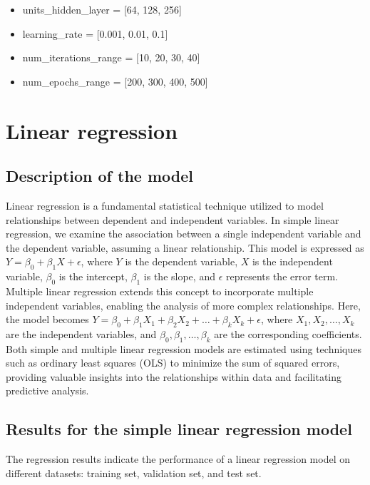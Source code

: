 \documentclass[10pt]{article} %
\begin{document}
     \begin{itemize}
        \item units\_hidden\_layer = [64, 128, 256]
        \item learning\_rate = [0.001, 0.01, 0.1]
        \item num\_iterations\_range = [10, 20, 30, 40]
        \item num\_epochs\_range = [200, 300, 400, 500]
    \end{itemize}
    \section{Linear regression}
    \subsection{Description of the model}
    Linear regression is a fundamental statistical technique utilized to model relationships between dependent and independent variables. In simple linear regression, we examine the association between a single independent variable and the dependent variable, assuming a linear relationship. This model is expressed as \(Y = \beta_0 + \beta_1 X + \epsilon\), where \(Y\) is the dependent variable, \(X\) is the independent variable, \(\beta_0\) is the intercept, \(\beta_1\) is the slope, and \(\epsilon\) represents the error term. Multiple linear regression extends this concept to incorporate multiple independent variables, enabling the analysis of more complex relationships. Here, the model becomes \(Y = \beta_0 + \beta_1 X_1 + \beta_2 X_2 + \ldots + \beta_k X_k + \epsilon\), where \(X_1, X_2, \ldots, X_k\) are the independent variables, and \(\beta_0, \beta_1, \ldots, \beta_k\) are the corresponding coefficients. Both simple and multiple linear regression models are estimated using techniques such as ordinary least squares (OLS) to minimize the sum of squared errors, providing valuable insights into the relationships within data and facilitating predictive analysis.


    \subsection{Results for the simple linear regression model}
    The regression results indicate the performance of a linear regression model on different datasets: training set, validation set, and test set. 
\end{document}
